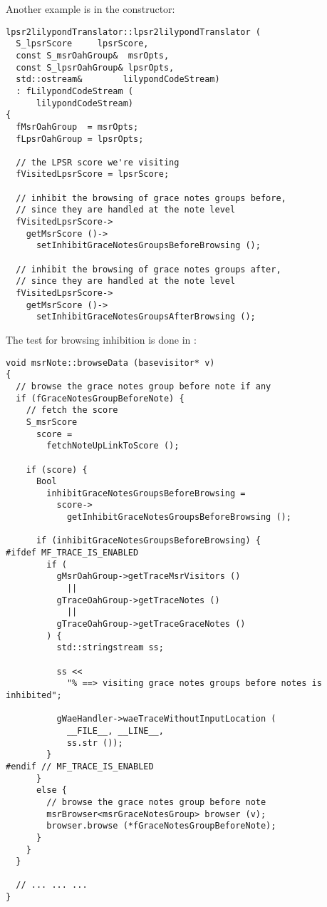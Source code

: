 Another example is in the  constructor:
\begin{lstlisting}[language=CPlusPlus]
lpsr2lilypondTranslator::lpsr2lilypondTranslator (
  S_lpsrScore     lpsrScore,
  const S_msrOahGroup&  msrOpts,
  const S_lpsrOahGroup& lpsrOpts,
  std::ostream&        lilypondCodeStream)
  : fLilypondCodeStream (
      lilypondCodeStream)
{
  fMsrOahGroup  = msrOpts;
  fLpsrOahGroup = lpsrOpts;

  // the LPSR score we're visiting
  fVisitedLpsrScore = lpsrScore;

  // inhibit the browsing of grace notes groups before,
  // since they are handled at the note level
  fVisitedLpsrScore->
    getMsrScore ()->
      setInhibitGraceNotesGroupsBeforeBrowsing ();

  // inhibit the browsing of grace notes groups after,
  // since they are handled at the note level
  fVisitedLpsrScore->
    getMsrScore ()->
      setInhibitGraceNotesGroupsAfterBrowsing ();
\end{lstlisting}

The test for browsing inhibition is done in :
\begin{lstlisting}[language=CPlusPlus]
void msrNote::browseData (basevisitor* v)
{
  // browse the grace notes group before note if any
  if (fGraceNotesGroupBeforeNote) {
    // fetch the score
    S_msrScore
      score =
        fetchNoteUpLinkToScore ();

    if (score) {
      Bool
        inhibitGraceNotesGroupsBeforeBrowsing =
          score->
            getInhibitGraceNotesGroupsBeforeBrowsing ();

      if (inhibitGraceNotesGroupsBeforeBrowsing) {
#ifdef MF_TRACE_IS_ENABLED
        if (
          gMsrOahGroup->getTraceMsrVisitors ()
            ||
          gTraceOahGroup->getTraceNotes ()
            ||
          gTraceOahGroup->getTraceGraceNotes ()
        ) {
          std::stringstream ss;

          ss <<
            "% ==> visiting grace notes groups before notes is inhibited";

          gWaeHandler->waeTraceWithoutInputLocation (
            __FILE__, __LINE__,
            ss.str ());
        }
#endif // MF_TRACE_IS_ENABLED
      }
      else {
        // browse the grace notes group before note
        msrBrowser<msrGraceNotesGroup> browser (v);
        browser.browse (*fGraceNotesGroupBeforeNote);
      }
    }
  }

  // ... ... ...
}
\end{lstlisting}


